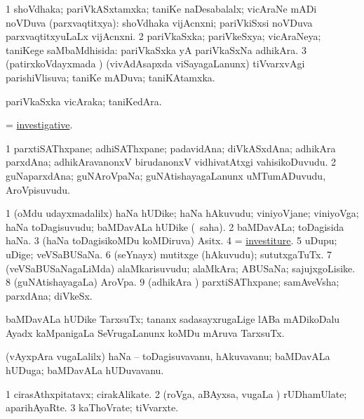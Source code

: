 \bentry
{}
\gl{\gu}
\bmng
\bnum
\num{1} shoVdhaka; pariVkASxtamxka; taniKe naDesabalalx; vicAraNe mADi noVDuva (parxvaqtitxya):  shoVdhaka vijAcnxni; pariVkiSxsi noVDuva parxvaqtitxyuLaLx vijAcnxni. 
\num{2} pariVkaSxka; pariVkeSxya; vicAraNeya; taniKege saMbaMdhisida:  pariVkaSxka yA pariVkaSxNa adhikAra. 
\num{3} (patirxkoVdayxmada \vi) (vivAdAsapxda viSayagaLanunx) tiVvarxvAgi parishiVlisuva; taniKe mADuva; taniKAtamxka. 
\enum
\emng
\eentry

\bentry
{}
\gl{\nA}
\bmng
pariVkaSxka vicAraka; taniKedAra. 
\emng
\eentry

\bentry
{}
\gl{\gu}
\bmng
= \hyperlink{investigative}{investigative}. 
\emng
\eentry

\bentry
{}
\gl{\nA}
\bmng
\bnum
\num{1} parxtiSAThxpane; adhiSAThxpane; padavidAna; diVkASxdAna; adhikAra parxdAna; adhikAravanonxV birudanonxV vidhivatAtxgi vahisikoDuvudu. 
\num{2} guNaparxdAna; guNAroVpaNa; guNAtishayagaLanunx uMTumADuvudu, AroVpisuvudu. 
\enum
\emng
\eentry

\bentry
{}
\gl{\nA}
\bmng
\bnum
\num{1} (oMdu udayxmadalilx) haNa hUDike; haNa hAkuvudu; viniyoVjane; viniyoVga; haNa toDagisuvudu; baMDavALa hUDike (\rUpa\ saha). 
\num{2} baMDavALa; toDagisida haNa. 
\num{3} (haNa toDagisikoMDu koMDiruva) Asitx. 
\num{4} =  \hyperlink{investiture}{investiture}. 
\num{5} uDupu; uDige; veVSaBUSaNa. 
\num{6} (seYnayx) mutitxge (hAkuvudu); sututxgaTuTx. 
\num{7} (veVSaBUSaNagaLiMda) alaMkarisuvudu; alaMkAra; ABUSaNa; sajujxgoLisike. 
\num{8} (guNAtishayagaLa) AroVpa. 
\num{9} (adhikAra \mo) parxtiSAThxpane; samAveVsha; parxdAna; diVkeSx. 
\enum
\emng
\eentry

\bentry
{}
\gl{\nA}
\bmng
baMDavALa hUDike TarxsuTx; tananx sadasayxrugaLige lABa mADikoDalu Ayadx kaMpanigaLa SeVrugaLanunx koMDu mAruva TarxsuTx. 
\emng
\eentry

\bentry
{}
\gl{\nA}
\bmng
(vAyxpAra \mo vugaLalilx) haNa -- toDagisuvavanu, hAkuvavanu; baMDavALa hUDuga; baMDavALa hUDuvavanu. 
\emng
\eentry

\bentry
{}
\gl{\nA}
\bmng
\bnum
\num{1} cirasAthxpitatavx; cirakAlikate. 
\num{2} (roVga, aBAyxsa, \mo vugaLa \vi) rUDhamUlate; aparihAyaRte. 
\num{3} kaThoVrate; tiVvarxte. 
\enum
\emng
\eentry

